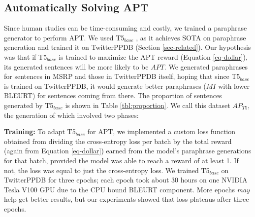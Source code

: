 \subsection{Automatically Solving APT}
\label{section-nap}

Since human studies can be time-consuming and costly, we trained a paraphrase generator to perform APT. We used T5$_{base}$ \cite{raffel2020exploring}, as it achieves SOTA on paraphrase generation \cite{niu2020unsupervised, bird2020chatbot, li2020agent} and trained it on TwitterPPDB (Section \ref{sec-related}). Our hypothesis was that if T5$_{base}$ is trained to maximize the APT reward (Equation \ref{eq-dollar}), its generated sentences will be more likely to be $APT$. We generated paraphrases for sentences in MSRP and those in TwitterPPDB itself, hoping that since T5$_{base}$ is trained on TwitterPPDB, it would generate better paraphrases ($MI$ with lower BLEURT) for sentences coming from there. The proportion of sentences generated by T5$_{base}$ is shown in Table \ref{tbl:proportion}. We call this dataset $AP_{T5}$, the generation of which involved two phases:

\noindent \textbf{Training:} To adapt T5$_{base}$ for APT, we implemented a custom loss function obtained from dividing the cross-entropy loss per batch by the total reward (again from Equation \ref{eq-dollar}) earned from the model's paraphrase generations for that batch, provided the model was able to reach a reward of at least 1. If not, the loss was equal to just the cross-entropy loss. We trained T5$_{base}$ on TwitterPPDB
for three epochs; each epoch took about 30 hours on one NVIDIA Tesla V100 GPU due to the CPU bound BLEURT component. More epochs \textit{may} help get better results, but our experiments showed that loss plateaus after three epochs.


